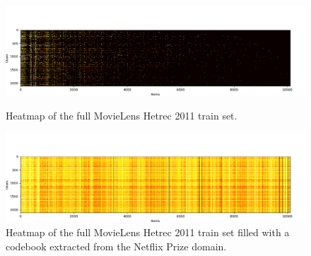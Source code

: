 \begin{figure}[hbt!]
\centering
\includegraphics[width=\textwidth]{pictures/movielens-full-target}
\caption{Heatmap of the full MovieLens Hetrec 2011 train set.}
\includegraphics[width=\textwidth]{pictures/movielens-full-target-filled}
\caption{Heatmap of the full MovieLens Hetrec 2011 train set filled with a codebook extracted from the Netflix Prize domain.}
\end{figure}


